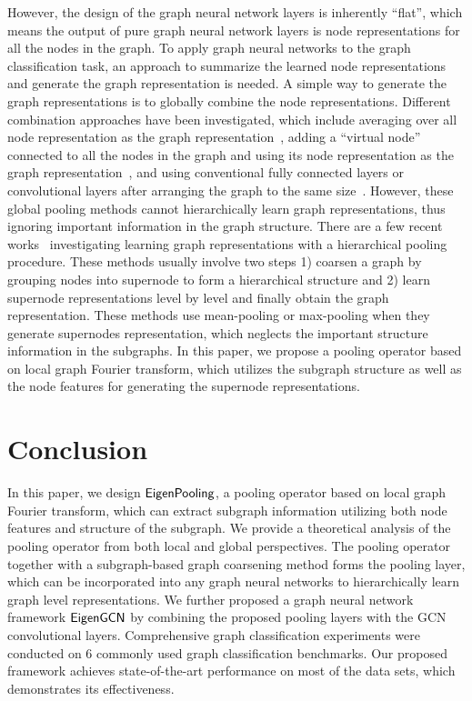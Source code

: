 \documentclass[sigconf]{acmart}
\newcommand{\m}{{\sf {EigenGCN}}}
\newcommand{\pooling}{{\sf {EigenPooling}}}
\begin{document}
However, the design of the graph neural network layers is inherently ``flat'', which means the output of pure graph neural network layers is node representations for all the nodes in the graph. To apply graph neural networks to the graph classification task, an approach to summarize the learned node representations and generate the graph representation is needed. A simple way to generate the graph representations is to globally combine the node representations. Different combination approaches have been investigated, which include averaging over all node representation as the graph representation~\cite{duvenaud2015convolutional}, adding a ``virtual node'' connected to all the nodes in the graph and using its node representation as the graph representation~\cite{li2015gated}, and using conventional fully connected layers or convolutional layers after arranging the graph to the same size~\cite{zhang2018end,gilmer2017neural}. However, these global pooling methods cannot hierarchically learn graph representations, thus ignoring important information in the graph structure. There are a few recent works~\cite{defferrard2016convolutional,ying2018hierarchical,simonovsky2017dynamic,fey2018splinecnn} investigating learning graph representations with a hierarchical pooling procedure. These methods usually involve two steps 1) coarsen a graph by grouping nodes into supernode to form a hierarchical structure and 2) learn supernode representations level by level and finally obtain the graph representation. These methods use mean-pooling or max-pooling when they generate supernodes representation, which neglects the important structure information in the subgraphs. In this paper, we propose a pooling operator based on local graph Fourier transform, which utilizes the subgraph structure as well as the node features for generating the supernode representations. \section{Conclusion} \label{sec:conlcusion}
In this paper, we design $\pooling$, a pooling operator based on local graph Fourier transform, which can extract subgraph information utilizing both node features and structure of the subgraph. We provide a theoretical analysis of the pooling operator from both local and global perspectives. The pooling operator together with a subgraph-based graph coarsening method forms the pooling layer, which can be incorporated into any graph neural networks to hierarchically learn graph level representations. We further proposed a graph neural network framework $\m$ by combining the proposed pooling layers with the GCN convolutional layers. Comprehensive graph classification experiments were conducted on $6$ commonly used graph classification benchmarks. Our proposed framework achieves state-of-the-art performance on most of the data sets, which demonstrates its effectiveness. 
\end{document}
